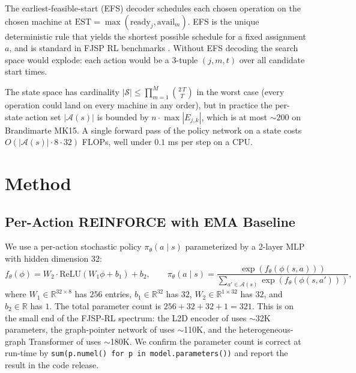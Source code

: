 \documentclass[10pt]{article}
\theoremstyle{definition}
\newcommand{\reals}{\mathbb{R}}
\begin{document}
The earliest-feasible-start (EFS) decoder schedules each
chosen operation on the chosen machine at
$\mathrm{EST} = \max(\mathrm{ready}_j, \mathrm{avail}_m)$.
EFS is the unique deterministic rule that yields the
shortest possible schedule for a fixed assignment $a$, and
is standard in FJSP RL benchmarks
\citep{Zhang2020L2D, Song2022TII}. Without
EFS decoding the search space would explode: each action
would be a 3-tuple $(j, m, t)$ over all candidate start
times.

The state space has cardinality
$|\mathcal{S}| \leq \prod_{m=1}^{M} \binom{2\,T}{T}$ in
the worst case (every operation could land on every machine
in any order), but in practice the per-state action set
$|\mathcal{A}(s)|$ is bounded by $n \cdot \max |E_{j,k}|$,
which is at most $\sim\!200$ on Brandimarte MK15.
A single forward pass of the policy network on a state
costs $O(|\mathcal{A}(s)| \cdot 8 \cdot 32)$ FLOPs,
well under $0.1$ ms per step on a CPU.

\section{Method}

\subsection{Per-Action REINFORCE with EMA Baseline}

We use a per-action stochastic policy
$\pi_\theta(a \mid s)$ parameterized by a 2-layer MLP with
hidden dimension 32:
\begin{equation}
  f_\theta(\phi) = W_2 \cdot \mathrm{ReLU}(W_1 \phi + b_1) + b_2,
  \qquad
  \pi_\theta(a \mid s) = \frac{\exp(f_\theta(\phi(s, a)))}
  {\sum_{a' \in \mathcal{A}(s)} \exp(f_\theta(\phi(s, a')))},
  \label{eq:policy}
\end{equation}
where $W_1 \in \reals^{32 \times 8}$ has $256$ entries,
$b_1 \in \reals^{32}$ has $32$, $W_2 \in \reals^{1 \times 32}$
has $32$, and $b_2 \in \reals$ has $1$. The total
parameter count is
$256 + 32 + 32 + 1 = 321$. This is on the small end of
the FJSP-RL spectrum: the L2D encoder of
\citet{Zhang2020L2D} uses $\sim$32K parameters, the
graph-pointer network of \citet{Lei2022} uses $\sim$110K,
and the heterogeneous-graph Transformer of
\citet{Yang2024} uses $\sim$180K. We confirm the
parameter count is correct at run-time by
\texttt{sum(p.numel() for p in model.parameters())} and
report the result in the code release.
\end{document}
